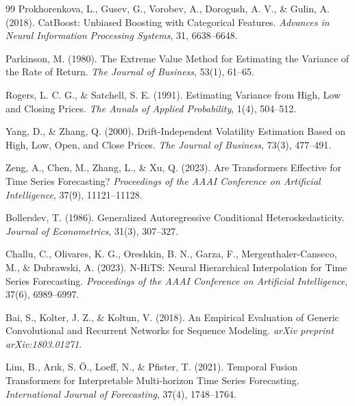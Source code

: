 \documentclass[11pt,a4paper]{article}
\begin{document}
\begin{thebibliography}{99}
Prokhorenkova, L., Gusev, G., Vorobev, A., Dorogush, A. V., \& Gulin, A. (2018).
\newblock CatBoost: Unbiased Boosting with Categorical Features.
\newblock \textit{Advances in Neural Information Processing Systems}, 31, 6638--6648.

Parkinson, M. (1980).
\newblock The Extreme Value Method for Estimating the Variance of the Rate of Return.
\newblock \textit{The Journal of Business}, 53(1), 61--65.

Rogers, L. C. G., \& Satchell, S. E. (1991).
\newblock Estimating Variance from High, Low and Closing Prices.
\newblock \textit{The Annals of Applied Probability}, 1(4), 504--512.

Yang, D., \& Zhang, Q. (2000).
\newblock Drift-Independent Volatility Estimation Based on High, Low, Open, and Close Prices.
\newblock \textit{The Journal of Business}, 73(3), 477--491.

Zeng, A., Chen, M., Zhang, L., \& Xu, Q. (2023).
\newblock Are Transformers Effective for Time Series Forecasting?
\newblock \textit{Proceedings of the AAAI Conference on Artificial Intelligence}, 37(9), 11121--11128.

Bollerslev, T. (1986).
\newblock Generalized Autoregressive Conditional Heteroskedasticity.
\newblock \textit{Journal of Econometrics}, 31(3), 307--327.

Challu, C., Olivares, K. G., Oreshkin, B. N., Garza, F., Mergenthaler-Canseco, M., \& Dubrawski, A. (2023).
\newblock N-HiTS: Neural Hierarchical Interpolation for Time Series Forecasting.
\newblock \textit{Proceedings of the AAAI Conference on Artificial Intelligence}, 37(6), 6989--6997.

Bai, S., Kolter, J. Z., \& Koltun, V. (2018).
\newblock An Empirical Evaluation of Generic Convolutional and Recurrent Networks for Sequence Modeling.
\newblock \textit{arXiv preprint arXiv:1803.01271}.

Lim, B., Arık, S. Ö., Loeff, N., \& Pfister, T. (2021).
\newblock Temporal Fusion Transformers for Interpretable Multi-horizon Time Series Forecasting.
\newblock \textit{International Journal of Forecasting}, 37(4), 1748--1764.


\end{thebibliography}
\end{document}
